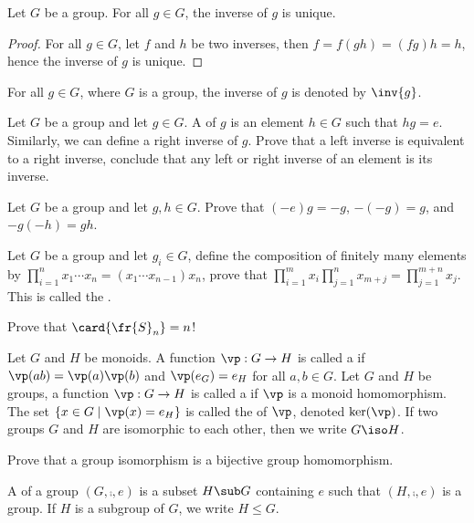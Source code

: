\documentclass[10pt]{article}
\begin{document}
\begin{proposition}
    Let $G$ be a group. For all $g\in G$, the inverse of $g$ is unique.
\end{proposition}
\begin{proof}
    For all $g\in G$, let $f$ and $h$ be two inverses, then $f=f(gh)=(fg)h=h$, hence the inverse of $g$ is unique.
\end{proof}
\par
For all $g\in G$, where $G$ is a group, the inverse of $g$ is denoted by $\inv{g}$.
\begin{problem}
    Let $G$ be a group and let $g\in G$. A  of $g$ is an element $h\in G$ such that $hg=e$. Similarly, we can define a right inverse of $g$. Prove that a left inverse is equivalent to a right inverse, conclude that any left or right inverse of an element is its inverse.
\end{problem}
\begin{problem}
    Let $G$ be a group and let $g,h\in G$. Prove that $(-e)g=-g$, $-(-g)=g$, and $-g(-h)=gh$.
\end{problem}
\begin{problem}
    Let $G$ be a group and let ${g}_{i}\in G$, define the composition of finitely many elements by ${\prod}_{i=1}^{n}{x}_{1}\cdots{x}_{n}=({x}_{1}\cdots{x}_{n-1}){x}_{n}$, prove that ${\prod}_{i=1}^{m}{x}_{i}{\prod}_{j=1}^{n}{x}_{m+j}={\prod}_{j=1}^{m+n}{x}_{j}$. This is called the .
\end{problem}
\begin{problem}
    Prove that $\card{{\fr{S}}_{n}}=n$!
\end{problem}
\begin{definition}
    Let $G$ and $H$ be monoids. A function $\vp:G\to H$ is called a  if $\vp(ab)=\vp(a)\vp(b)$ and $\vp({e}_{G})={e}_{H}$ for all $a,b\in G$. Let $G$ and $H$ be groups, a function $\vp:G\to H$ is called a  if $\vp$ is a monoid homomorphism. The set $\{x\in G\mid\vp(x)={e}_{H}\}$ is called the  of $\vp$, denoted $\ker(\vp)$. If two groups $G$ and $H$ are isomorphic to each other, then we write $G\iso H$.
\end{definition}
\begin{problem}
    Prove that a group isomorphism is a bijective group homomorphism.
\end{problem}
\begin{definition}
    A  of a group $(G,\comp,e)$ is a subset $H\sub G$ containing $e$ such that $(H,\comp,e)$ is a group. If $H$ is a subgroup of $G$, we write $H\le G$.
\end{definition}
\end{document}
